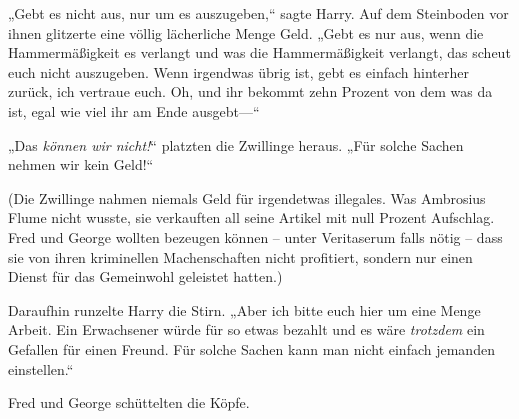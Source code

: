 „Gebt es nicht aus, nur um es auszugeben,“ sagte Harry. Auf dem Steinboden vor ihnen glitzerte eine völlig lächerliche Menge Geld. „Gebt es nur aus, wenn die Hammermäßigkeit es verlangt und was die Hammermäßigkeit verlangt, das scheut euch nicht auszugeben. Wenn irgendwas übrig ist, gebt es einfach hinterher zurück, ich vertraue euch. Oh, und ihr bekommt zehn Prozent von dem was da ist, egal wie viel ihr am Ende ausgebt—“

„Das \emph{können wir nicht!}“ platzten die Zwillinge heraus. „Für solche Sachen nehmen wir kein Geld!“

(Die Zwillinge nahmen niemals Geld für irgendetwas illegales. Was Ambrosius Flume nicht wusste, sie verkauften all seine Artikel mit null Prozent Aufschlag. Fred und George wollten bezeugen können -- unter Veritaserum falls nötig -- dass sie von ihren kriminellen Machenschaften nicht profitiert, sondern nur einen Dienst für das Gemeinwohl geleistet hatten.)

Daraufhin runzelte Harry die Stirn. „Aber ich bitte euch hier um eine Menge Arbeit. Ein Erwachsener würde für so etwas bezahlt und es wäre \emph{trotzdem} ein Gefallen für einen Freund. Für solche Sachen kann man nicht einfach jemanden einstellen.“

Fred und George schüttelten die Köpfe.

